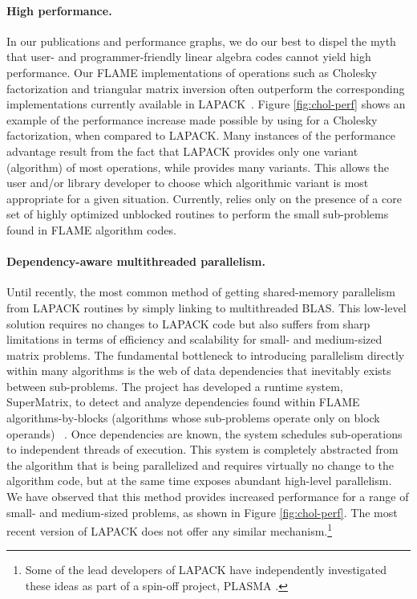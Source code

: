 \paragraph{High performance.}
In our publications and performance graphs, we do our best to dispel the
myth that user- and programmer-friendly linear algebra codes cannot yield
high performance.
Our FLAME implementations of operations such as Cholesky factorization and
triangular matrix inversion often outperform the corresponding implementations
currently available in LAPACK~\cite{Bientinesi:2008:FAR}.
Figure \ref{fig:chol-perf} shows an example of the performance increase
made possible by using \libflame for a Cholesky factorization, when compared
to LAPACK.
Many instances of the \libflame performance advantage result from the fact
that LAPACK provides only one variant (algorithm) of most operations,
while \libflame provides many variants.
This allows the user and/or library developer to choose which algorithmic
variant is most appropriate for a given situation.
Currently, \libflame relies only on the presence of a core set of highly
optimized unblocked routines to perform the small sub-problems found in FLAME
algorithm codes.
%

\paragraph{Dependency-aware multithreaded parallelism.}
Until recently, the most common method of getting shared-memory parallelism
from LAPACK routines by simply linking to multithreaded BLAS.
This low-level solution requires no changes to LAPACK code but also suffers
from sharp limitations in terms of efficiency and scalability for small-
and medium-sized matrix problems.
The fundamental bottleneck to introducing parallelism directly within many
algorithms is the web of data dependencies that inevitably exists between
sub-problems.
The \libflame project has developed a runtime system, SuperMatrix, to detect
and analyze dependencies found within FLAME algorithms-by-blocks
(algorithms whose sub-problems operate only on block operands)%
~\cite{spaa2007,SuperMatrix:PPoPP08,SuperMatrix:PPoPP09,SuperMatrix:TOMS}.
Once dependencies are known, the system schedules sub-operations to
independent threads of execution.
This system is completely abstracted from the algorithm that is being
parallelized and requires virtually no change to the algorithm code, but at
the same time exposes abundant high-level parallelism.
We have observed that this method provides increased performance for a
range of small- and medium-sized problems, as shown in Figure
\ref{fig:chol-perf}.
The most recent version of LAPACK does not offer any similar
mechanism.\footnote{Some of the lead developers of LAPACK have independently
investigated these ideas as part of a spin-off project,
PLASMA \cite{LAWN190,LAWN191,emmanuel2009}.}

